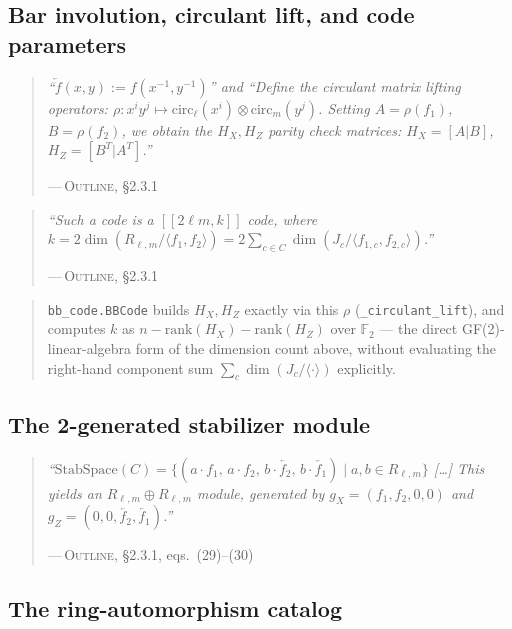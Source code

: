 \documentclass[11pt]{article}
\theoremstyle{plain}
\theoremstyle{definition}
\newenvironment{paperquote}[1]{%
  \def\paperquotecite{#1}%
  \begin{quotation}\noindent\itshape\small
}{%
  \normalfont\par\hfill---\,\textsc{Outline}, \paperquotecite\medskip
  \end{quotation}
}
\newcommand{\pq}[2]{\begin{paperquote}{#1}#2\end{paperquote}}
\newenvironment{mynote}{%
  \begin{quotation}\noindent\small
}{%
  \end{quotation}
}
\begin{document}
\subsection{Bar involution, circulant lift, and code parameters}

\pq{\S2.3.1}{%
``$\overleftarrow{f}(x,y) := f(x^{-1},y^{-1})$'' \quad and \quad
``Define the circulant matrix lifting operators:
$\rho : x^iy^j \mapsto \mathrm{circ}_\ell(x^i)\otimes\mathrm{circ}_m(y^j)$.
Setting $A=\rho(f_1)$, $B=\rho(f_2)$, we obtain the $H_X,H_Z$ parity check
matrices: $H_X=[A|B]$, $H_Z=[B^T|A^T]$.''
}

\pq{\S2.3.1}{%
``Such a code is a $[[2\ell m, k]]$ code, where
$k = 2\dim(R_{\ell,m}/\langle f_1,f_2\rangle) =
2\sum_{c\in C}\dim(J_c/\langle f_{1,c},f_{2,c}\rangle)$.''
}

\begin{mynote}
\texttt{bb\_code.BBCode} builds $H_X,H_Z$ exactly via this $\rho$
(\texttt{\_circulant\_lift}), and computes $k$ as $n-\mathrm{rank}(H_X)-
\mathrm{rank}(H_Z)$ over $\mathbb{F}_2$ --- the direct GF(2)-linear-algebra
form of the dimension count above, without evaluating the right-hand
component sum $\sum_c\dim(J_c/\langle\cdot\rangle)$ explicitly.
\end{mynote}

\subsection{The 2-generated stabilizer module}

\pq{\S2.3.1, eqs.\ (29)--(30)}{%
``$\mathrm{StabSpace}(C) = \{(a\cdot f_1,\, a\cdot f_2,\, b\cdot
\overleftarrow{f_2},\, b\cdot\overleftarrow{f_1}) \mid a,b\in R_{\ell,m}\}$
[\ldots] This yields an $R_{\ell,m}\oplus R_{\ell,m}$ module, generated by
$g_X=(f_1,f_2,0,0)$ and $g_Z=(0,0,\overleftarrow{f_2},\overleftarrow{f_1})$.''
}

\subsection{The ring-automorphism catalog}
\end{document}
